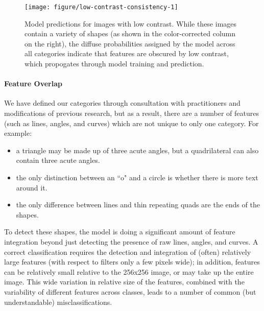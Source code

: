 \documentclass{article}\usepackage[]{graphicx}\usepackage[table]{xcolor}
\newenvironment{knitrout}{}{} %
\begin{document}
\begin{knitrout}
\color{fgcolor}\begin{figure}[p!]

{\centering \texttt{[image: figure/low-contrast-consistency-1]}

}

\caption[Model predictions for images with low contrast]{Model predictions for images with low contrast. While these images contain a variety of shapes (as shown in the color-corrected column on the right), the diffuse probabilities assigned by the model across all categories indicate that features are obscured by low contrast, which propogates through model training and prediction.}\label{fig:low-contrast-consistency}
\end{figure}


\end{knitrout}

\paragraph{Feature Overlap}
We have defined our categories through consultation with practitioners and modifications of previous research, but as a result, there are a number of features (such as lines, angles, and curves) which are not unique to only one category. For example:
\begin{itemize}
\item a triangle may be made up of three acute angles, but a quadrilateral can also contain three acute angles.
\item the only distinction between an ``o" and a circle is whether there is more text around it.
\item the only difference between lines and thin repeating quads are the ends of the shapes.
\end{itemize}

To detect these shapes, the model is doing a significant amount of feature integration beyond just detecting the presence of raw lines, angles, and curves. A correct classification requires the detection and integration of (often) relatively large features (with respect to filters only a few pixels wide); in addition, features can be relatively small relative to the 256x256 image, or may take up the entire image. This wide variation in relative size of the features, combined with the variability of different features across classes, leads to a number of common (but understandable) misclassifications.
\end{document}
